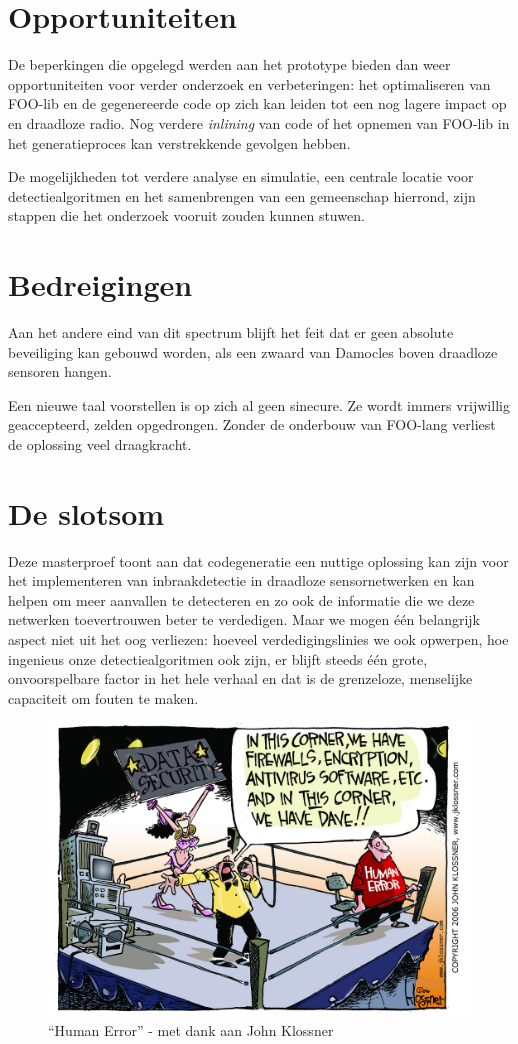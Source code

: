 \section{Opportuniteiten}
\label{section:opportunities}

De beperkingen die opgelegd werden aan het prototype bieden dan weer
opportuniteiten voor verder onderzoek en verbeteringen: het optimaliseren van
FOO-lib en de gegenereerde code op zich kan leiden tot een nog lagere impact op
\mcu en draadloze radio. Nog verdere \emph{inlining} van code of het opnemen
van FOO-lib in het generatieproces kan verstrekkende gevolgen hebben.

De mogelijkheden tot verdere analyse en simulatie, een centrale locatie voor
detectiealgoritmen en het samenbrengen van een gemeenschap hierrond, zijn
stappen die het onderzoek vooruit zouden kunnen stuwen.

\vspace{-2mm}

\section{Bedreigingen}
\label{section:threaths}

Aan het andere eind van dit spectrum blijft het feit dat er geen absolute
beveiliging kan gebouwd worden, als een zwaard van Damocles boven draadloze
sensoren hangen.

Een nieuwe taal voorstellen is op zich al geen sinecure. Ze wordt immers
vrijwillig geaccepteerd, zelden opgedrongen. Zonder de onderbouw van FOO-lang
verliest de oplossing veel draagkracht.

\vspace{-2mm}

\section{De slotsom}
\label{section:bottom-line}

Deze masterproef toont aan dat codegeneratie een nuttige oplossing kan zijn
voor het implementeren van inbraakdetectie in draadloze sensornetwerken en kan
helpen om meer aanvallen te detecteren en zo ook de informatie die we deze
netwerken toevertrouwen beter te verdedigen. Maar we mogen \'e\'en belangrijk
aspect niet uit het oog verliezen: hoeveel verdedigingslinies we ook opwerpen,
hoe ingenieus onze detectiealgoritmen ook zijn, er blijft steeds \'e\'en grote,
onvoorspelbare factor in het hele verhaal en dat is de grenzeloze, menselijke
capaciteit om fouten te maken.

\begin{figure}[ht]
  \centering
  \includegraphics[width=0.70\linewidth]{resources/cartoon_human_error.jpg}
  \caption[``Human Error'']{``Human Error'' - met dank aan John Klossner}
\end{figure}
